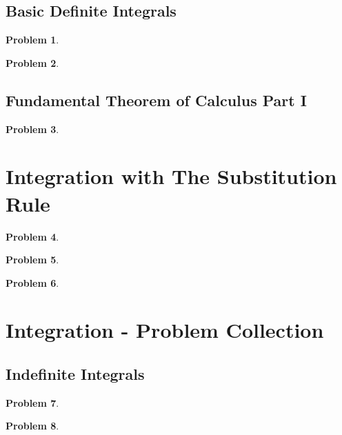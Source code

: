 \documentclass{article}
\newtheorem{problem}{Problem}
\begin{document}
\subsection{Basic Definite Integrals}
\begin{problem}

\end{problem}

\begin{problem}

\end{problem}
\subsection{Fundamental Theorem of Calculus Part I}
\begin{problem}

\end{problem}

\section{Integration with The Substitution Rule}
\begin{problem}

\end{problem}

\begin{problem}

\end{problem}

\begin{problem}

\end{problem}



\section{Integration - Problem Collection}
\subsection{Indefinite Integrals}
\begin{problem}

\end{problem}

\begin{problem}

\end{problem}
\end{document}
